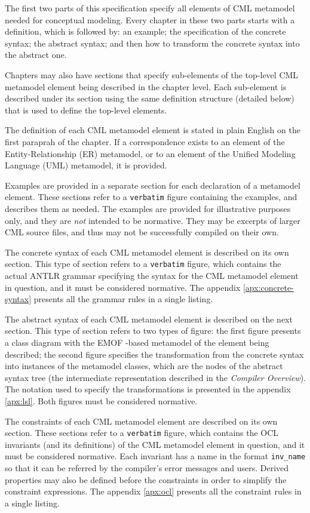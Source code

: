 The first two parts of this specification specify all elements of CML metamodel
needed for conceptual modeling.
Every chapter in these two parts starts with a definition,
which is followed by: an example;
the specification of the concrete syntax;
the abstract syntax;
and then how to transform the concrete syntax into the abstract one.

Chapters may also have sections that specify sub-elements
of the top-level CML metamodel element being described in the chapter level.
Each sub-element is described under its section
using the same definition structure (detailed below)
that is used to define the top-level elements.

The definition of each CML metamodel element is stated in plain English
on the first paraprah of the chapter.
If a correspondence exists to an element of
the Entity-Relationship (ER) \cite{er} metamodel,
or to an element of the Unified Modeling Language (UML) \cite{uml} metamodel,
it is provided.

Examples are provided in a separate section
for each declaration of a metamodel element.
These sections refer to a \verb+verbatim+ figure containing the examples,
and describes them as needed.
The examples are provided for illustrative purposes only,
and they are \emph{not} intended to be normative.
They may be excerpts of larger CML source files,
and thus may not be successfully compiled on their own.

The concrete syntax of each CML metamodel element is described
on its own section.
This type of section refers to a \verb+verbatim+ figure,
which contains the actual ANTLR \cite{antlr} grammar
specifying the syntax for the CML metamodel element in question,
and it must be considered normative.
The appendix \ref{apx:concrete-syntax} presents all the grammar rules
in a single listing.

The abstract syntax of each CML metamodel element is described
on the next section.
This type of section refers to two types of figure:
the first figure presents a class diagram
with the EMOF \cite{mof}-based metamodel
of the element being described;
the second figure specifies the transformation
from the concrete syntax into instances of the metamodel classes,
which are the nodes of the abstract syntax tree
(the intermediate representation described in the \emph{Compiler Overview}).
The notation used to specify the transformations is presented
in the appendix \ref{apx:lsl}.
Both figures must be considered normative.

The constraints of each CML metamodel element are described
on its own section.
These sections refer to a \verb+verbatim+ figure,
which contains the OCL \cite{ocl} invariants
(and its definitions)
of the CML metamodel element in question,
and it must be considered normative.
Each invariant has a name in the format \verb+inv_name+
so that it can be referred by the compiler's error messages
and users.
Derived properties may also be defined before the constraints
in order to simplify the constraint expressions.
The appendix \ref{apx:ocl} presents all the constraint rules
in a single listing.

